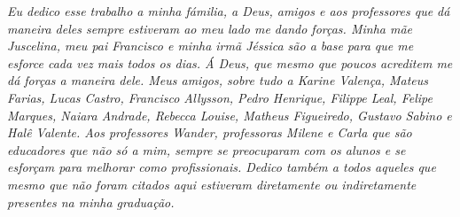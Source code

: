 \begin{dedicatoria}
   \vspace*{\fill}
   \centering
   \noindent
   \textit{Eu dedico esse trabalho a minha fámilia, a Deus, amigos e aos professores que dá maneira deles sempre estiveram ao meu lado me dando forças. Minha mãe Juscelina, meu pai Francisco e minha irmã Jéssica são a base para que me esforce cada vez mais todos os dias. Á Deus, que mesmo que poucos acreditem me dá forças a maneira dele. Meus amigos, sobre tudo a Karine Valença, Mateus Farias, Lucas Castro, Francisco Allysson, Pedro Henrique, Filippe Leal, Felipe Marques, Naiara Andrade, Rebecca Louise, Matheus Figueiredo, Gustavo Sabino e Halê Valente. Aos professores Wander, professoras Milene e Carla que são educadores que não só a mim, sempre se preocuparam com os alunos e se esforçam para melhorar como profissionais. Dedico também a todos aqueles que mesmo que não foram citados aqui estiveram diretamente ou indiretamente presentes na minha graduação.}
   \vspace*{\fill}
\end{dedicatoria}
